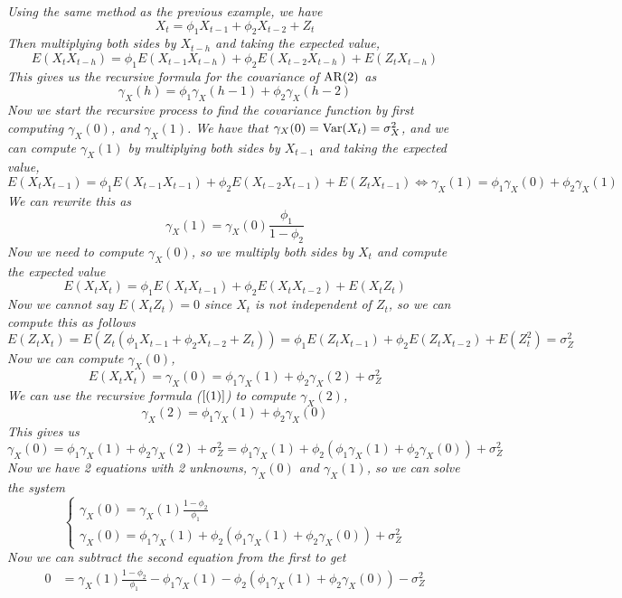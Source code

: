 \begin{example}[AR(2)]
    \emph{
        Using the same method as the previous example, we have
        \[X_t = \phi_1X_{t-1} + \phi_2X_{t-2} + Z_t\]
        Then multiplying both sides by $X_{t-h}$ and taking the expected value,
        \[E(X_tX_{t-h}) = \phi_1E(X_{t-1}X_{t-h}) + \phi_2E(X_{t-2}X_{t-h}) + E(Z_tX_{t-h})\]
        This gives us the recursive formula for the covariance of $\operatorname{AR}(2)$ as 
        \[\gamma_X(h) = \phi_1\gamma_X(h-1) + \phi_2\gamma_X(h-2)\tag{1}\label{(1)}\]
        Now we start the recursive process to find the covariance function by first computing $\gamma_X(0)$, and $\gamma_X(1)$. We have that $\gamma_X(0) = \operatorname{Var}(X_t) = \sigma_X^2$, and we can compute $\gamma_X(1)$ by multiplying both sides by $X_{t-1}$ and taking the expected value,
        \[E(X_tX_{t-1}) = \phi_1E(X_{t-1}X_{t-1}) + \phi_2E(X_{t-2}X_{t-1}) + E(Z_tX_{t-1}) \iff \gamma_X(1) = \phi_1\gamma_X(0) + \phi_2\gamma_X(1) \]
        We can rewrite this as 
        \[\gamma_X(1) = \gamma_X(0)\frac{\phi_1}{1 - \phi_2}\]
        Now we need to compute $\gamma_X(0)$, so we multiply both sides by $X_t$ and compute the expected value 
        \[E(X_tX_t) = \phi_1E(X_tX_{t-1}) + \phi_2E(X_tX_{t-2}) + E(X_tZ_t)\]
        Now we cannot say $E(X_tZ_t) = 0$ since $X_t$ is not independent of $Z_t$, so we can compute this as follows 
        \[E(Z_tX_t) = E(Z_t(\phi_1X_{t-1} + \phi_2X_{t-2} + Z_t)) = \phi_1E(Z_tX_{t-1}) + \phi_2E(Z_tX_{t-2}) + E(Z_t^2) = \sigma_Z^2\]
        Now we can compute $\gamma_X(0)$,
        \[E(X_tX_t) = \gamma_X(0) = \phi_1\gamma_X(1) +  \phi_2\gamma_X(2) + \sigma_Z^2\]
        We can use the recursive formula ($\ref{(1)}$) to compute $\gamma_X(2)$,
        \[\gamma_X(2) = \phi_1\gamma_X(1) + \phi_2\gamma_X(0)\]
        This gives us 
        \[\gamma_X(0) = \phi_1\gamma_X(1) + \phi_2\gamma_X(2)  + \sigma_Z^2 = \phi_1\gamma_X(1) + \phi_2(\phi_1\gamma_X(1) + \phi_2\gamma_X(0)) + \sigma_Z^2\]
        Now we have 2 equations with 2 unknowns, $\gamma_X(0)$ and $\gamma_X(1)$, so we can solve the system 
        \[\begin{cases}
            \gamma_X(0) = \gamma_X(1)\frac{1-\phi_2}{\phi_1} \\
            \gamma_X(0) = \phi_1\gamma_X(1) + \phi_2(\phi_1\gamma_X(1) + \phi_2\gamma_X(0)) + \sigma_Z^2 
        \end{cases}\]
        Now we can subtract the second equation from the first to get 
        \begin{align*}
            0 &= \gamma_X(1)\frac{1-\phi_2}{\phi_1} - \phi_1\gamma_X(1) - \phi_2(\phi_1\gamma_X(1) + \phi_2\gamma_X(0)) - \sigma_Z^2\\

\end{align*}}
\end{example}
